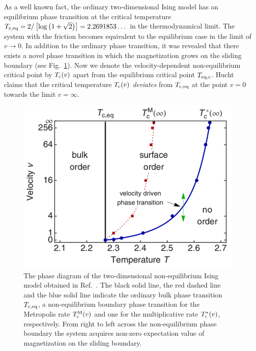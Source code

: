 
As a well known fact, the ordinary two-dimensional Ising model has an equilibrium phase transition at the critical temperature $T_{\rm c,eq}=2/\left[\log\left(1+\sqrt{2}\right)\right]=2.2691853\dots$ in the thermodynamical limit. The system with the friction becomes equivalent to the equilibrium case in the limit of $v\to 0$. In addition to the ordinary phase transition, it was revealed \cite{Kadau2008,Hucht2009b} that there exists a novel phase transition in which the magnetization grows on the sliding boundary (see Fig.~\ref{fig:NEPTinIsing}). Now we denote the velocity-dependent non-equilibrium critical point by $T_{\rm c}(v)$ apart from the equilibrium critical point $T_{\rm eq, c}$. Hucht \cite{Hucht2009b} claims that the critical temperature $T_{\rm c}(v)$ \textit{deviates} from $T_{\rm c,eq}$ at the point $v=0$ towards the limit $v=\infty$.

\begin{figure}[htbp]
\centering
\includegraphics[width=0.5\linewidth]{Fig15.pdf}
\caption{The phase diagram of the two-dimensional non-equilibrium Ising model obtained in Ref.~\cite{Hucht2009b}\protect\footnotemark. The black solid line, the red dashed line and the blue solid line indicate the ordinary bulk phase transition $T_{\rm c,eq}$, a non-equilibrium boundary phase transition for the Metropolis rate $T_{\rm c}^{\rm M}(v)$ and one for the multiplicative rate $T_{\rm c}^{*}(v)$, respectively. From right to left across the non-equilibrium phase boundary the system acquires non-zero expectation value of magnetization on the sliding boundary.}
\label{fig:NEPTinIsing}
\end{figure}


